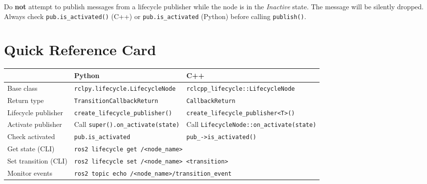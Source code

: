 \documentclass[12pt,a4paper]{article}
\newcommand{\code}[1]{\texttt{#1}}
\begin{document}
\begin{warnbox}
  Do \textbf{not} attempt to publish messages from a lifecycle publisher while
  the node is in the \emph{Inactive} state.  The message will be silently
  dropped.  Always check \code{pub.is\_activated()} (C++) or
  \code{pub.is\_activated} (Python) before calling \code{publish()}.
\end{warnbox}

\section{Quick Reference Card}
\label{sec:quickref}

\begin{center}
\begin{tabular}{p{3.2cm}p{5.2cm}p{5.2cm}}
  \toprule
  & \textbf{Python} & \textbf{C++} \\
  \midrule
  Base class &
  \code{rclpy.lifecycle.LifecycleNode} &
  \code{rclcpp\_lifecycle::LifecycleNode} \\
  \midrule
  Return type &
  \code{TransitionCallbackReturn} &
  \code{CallbackReturn} \\
  \midrule
  Lifecycle publisher &
  \code{create\_lifecycle\_publisher()} &
  \code{create\_lifecycle\_publisher<T>()} \\
  \midrule
  Activate publisher &
  Call \code{super().on\_activate(state)} &
  Call \code{LifecycleNode::on\_activate(state)} \\
  \midrule
  Check activated &
  \code{pub.is\_activated} &
  \code{pub\_->is\_activated()} \\
  \midrule
  Get state (CLI) &
  \multicolumn{2}{l}{\code{ros2 lifecycle get /<node\_name>}} \\
  \midrule
  Set transition (CLI) &
  \multicolumn{2}{l}{\code{ros2 lifecycle set /<node\_name> <transition>}} \\
  \midrule
  Monitor events &
  \multicolumn{2}{l}{\code{ros2 topic echo /<node\_name>/transition\_event}} \\
  \bottomrule
\end{tabular}
\end{center}

\appendix
\end{document}
